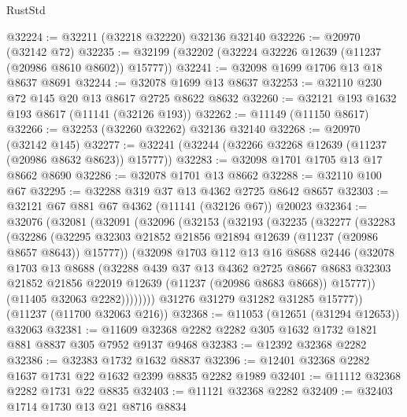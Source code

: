 \begin{lexlean}{RustStd}
\begin{coremodule}
@32224 := @32211 (@32218 @32220) @32136 @32140
@32226 := @20970 (@32142 @72)
@32235 := @32199 (@32202 (@32224 @32226 @12639 (@11237 (@20986 @8610 @8602)) @15777))
@32241 := @32098 @1699 @1706 @13 @18 @8637 @8691
@32244 := @32078 @1699 @13 @8637
@32253 := @32110 @230 @72 @145 @20 @13 @8617 @2725 @8622 @8632
@32260 := @32121 @193 @1632 @193 @8617 (@11141 (@32126 @193))
@32262 := @11149 (@11150 @8617)
@32266 := @32253 (@32260 @32262) @32136 @32140
@32268 := @20970 (@32142 @145)
@32277 := @32241 (@32244 (@32266 @32268 @12639 (@11237 (@20986 @8632 @8623)) @15777))
@32283 := @32098 @1701 @1705 @13 @17 @8662 @8690
@32286 := @32078 @1701 @13 @8662
@32288 := @32110 @100 @67
@32295 := @32288 @319 @37 @13 @4362 @2725 @8642 @8657
@32303 := @32121 @67 @881 @67 @4362 (@11141 (@32126 @67)) @20023
@32364 := @32076
    (@32081
      (@32091
        (@32096
          (@32153
            (@32193
              (@32235
                (@32277
                  (@32283
                    (@32286
                      (@32295
                        @32303
                        @21852
                        @21856
                        @21894
                        @12639
                        (@11237 (@20986 @8657 @8643))
                        @15777))
                    (@32098
                      @1703
                      @112
                      @13
                      @16
                      @8688
                      @2446
                      (@32078
                        @1703
                        @13
                        @8688
                        (@32288
                          @439
                          @37
                          @13
                          @4362
                          @2725
                          @8667
                          @8683
                          @32303
                          @21852
                          @21856
                          @22019
                          @12639
                          (@11237 (@20986 @8683 @8668))
                          @15777))
                      (@11405 @32063 @2282))))))))
        @31276
        @31279
        @31282
        @31285
        @15777))
    (@11237 (@11700 @32063 @216))
@32368 := @11053 (@12651 (@31294 @12653)) @32063
@32381 := @11609 @32368 @2282 @2282 @305 @1632 @1732 @1821 @881 @8837 @305 @7952 @9137 @9468
@32383 := @12392 @32368 @2282
@32386 := @32383 @1732 @1632 @8837
@32396 := @12401 @32368 @2282 @1637 @1731 @22 @1632 @2399 @8835 @2282 @1989
@32401 := @11112 @32368 @2282 @1731 @22 @8835
@32403 := @11121 @32368 @2282
@32409 := @32403 @1714 @1730 @13 @21 @8716 @8834

\end{coremodule}
\end{lexlean}
